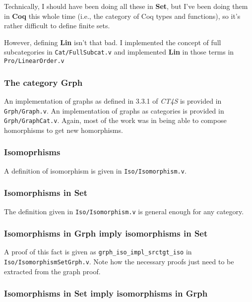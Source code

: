 \documentclass[12pt,twocolumn,oneside]{book}
\begin{document}
Technically, I should have been doing all these in \textbf{Set}, but I've been
doing them in \textbf{Coq} this whole time (i.e., the category of Coq
types and functions), so it's rather difficult to define finite sets.

However, defining \textbf{Lin} isn't that bad. I implemented the concept of full
subcategories in \texttt{Cat/FullSubcat.v} and implemented \textbf{Lin} in those terms
in \texttt{Pro/LinearOrder.v}

\subsubsection{The category \textbf{Grph}}

An implementation of graphs as defined in 3.3.1 of \emph{CT4S} is provided in
\texttt{Grph/Graph.v}. An implementation of graphs as categories is provided in
\texttt{Grph/GraphCat.v}. Again, most of the work was in being able to compose homorphisms
to get new homorphisms.

\subsubsection{Isomoprhisms}

A definition of isomorphism is given in \texttt{Iso/Isomorphism.v}.

\subsubsection{Isomorphisms in \textbf{Set}}

The definition given in \texttt{Iso/Isomorphism.v} is general enough for any category.

\subsubsection{Isomorphisms in \textbf{Grph} imply isomorphisms in \textbf{Set}}

A proof of this fact is given as \texttt{grph\_iso\_impl\_srctgt\_iso} in \texttt{Iso/IsomorphismSetGrph.v}.
Note how the necessary proofs just need to be extracted from the graph proof.

\subsubsection{Isomorphisms in \textbf{Set} imply isomorphisms in \textbf{Grph}}
\end{document}
